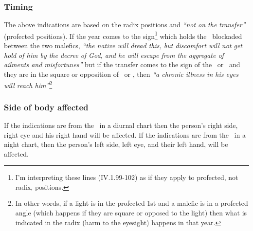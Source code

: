 \subsubsection{Timing}
The above indications are based on the radix positions and \textsl{``not on the transfer''} (profected positions). If the year comes to the sign\footnote{I'm interpreting these lines (IV.1.99-102) as if they apply to profected, not radix, positions.} which holds the \Moon\, blockaded between the two malefics, \textsl{``the native will dread this, but discomfort will not get hold of him by the decree of God, and he will escape from the aggregate of ailments and misfortunes''} but if the transfer comes to the sign of the \Sun\, or \Moon\, and they are in the square or opposition of \Saturn\, or \Mars, then \textsl{``a chronic illness in his eyes will reach him''}\footnote{In other words, if a light is in the profected 1st and a malefic is in a profected angle (which happens if they are square or opposed to the light) then what is indicated in the radix (harm to the eyesight) happens in that year.}

\subsubsection{Side of body affected}
If the indications are from the \Sun\, in a diurnal chart then the person's right side, right eye and his right hand will be affected. If the indications are from the \Moon\, in a night chart, then the person's left side, left eye, and their left hand, will be affected. 


